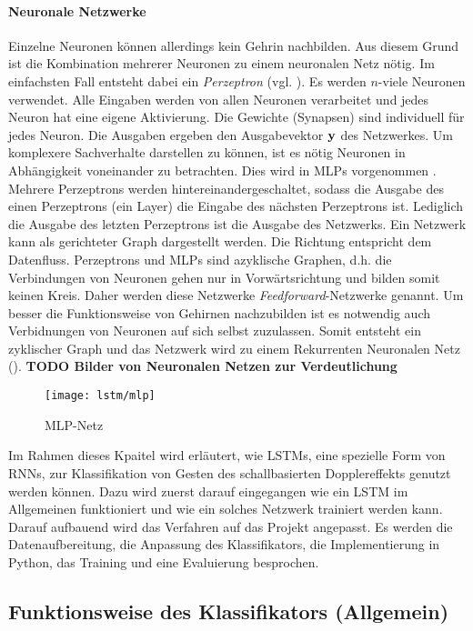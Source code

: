 \paragraph{Neuronale Netzwerke}
Einzelne Neuronen können allerdings kein Gehrin nachbilden. Aus diesem Grund ist
die Kombination mehrerer Neuronen zu einem neuronalen Netz nötig. Im einfachsten
Fall entsteht dabei ein \textit{Perzeptron} (vgl.
\cite{rosenblatt58a,1165576}). Es werden $n$-viele Neuronen
verwendet. Alle Eingaben werden von allen Neuronen verarbeitet und jedes Neuron
hat eine eigene Aktivierung. Die Gewichte (Synapsen) sind individuell für jedes
Neuron. Die Ausgaben ergeben den Ausgabevektor $\bf{y}$ des Netzwerkes. Um
komplexere Sachverhalte darstellen zu können, ist es nötig Neuronen in Abhängigkeit
voneinander zu betrachten. Dies wird in \acp{MLP} vorgenommen \cite{1165576}.
Mehrere Perzeptrons werden hintereinandergeschaltet, sodass die Ausgabe des
einen Perzeptrons (ein Layer) die Eingabe des nächsten Perzeptrons ist.
Lediglich die Ausgabe des letzten Perzeptrons ist die Ausgabe des Netzwerks.
Ein Netzwerk kann als gerichteter Graph dargestellt werden. Die Richtung
entspricht dem Datenfluss. Perzeptrons und \acp{MLP} sind azyklische Graphen,
d.h. die Verbindungen von Neuronen gehen nur in Vorwärtsrichtung und bilden
somit keinen Kreis. Daher werden diese Netzwerke \textit{Feedforward}-Netzwerke
genannt. Um besser die Funktionsweise von Gehirnen nachzubilden ist es notwendig
auch Verbidnungen von Neuronen auf sich selbst zuzulassen. Somit entsteht ein
zyklischer Graph und das Netzwerk wird zu einem Rekurrenten Neuronalen Netz
().
\textbf{TODO Bilder von Neuronalen Netzen zur Verdeutlichung}

\begin{figure}[htbp]
    \centering
   \texttt{[image: lstm/mlp]}
\caption{MLP-Netz}
\label{fig:mlp}
\end{figure}

Im Rahmen dieses Kpaitel wird erläutert, wie \acsp{LSTM}, eine spezielle Form
von \acp{RNN}, zur Klassifikation von Gesten des schallbasierten Dopplereffekts
genutzt werden können. Dazu wird zuerst darauf eingegangen wie ein \ac{LSTM} im
Allgemeinen funktioniert und wie ein solches Netzwerk trainiert werden kann.
Darauf aufbauend wird das Verfahren auf das Projekt angepasst. Es werden die
Datenaufbereitung, die Anpassung des Klassifikators, die Implementierung in
Python, das Training und eine Evaluierung besprochen.


\subsection{Funktionsweise des Klassifikators (Allgemein)}

